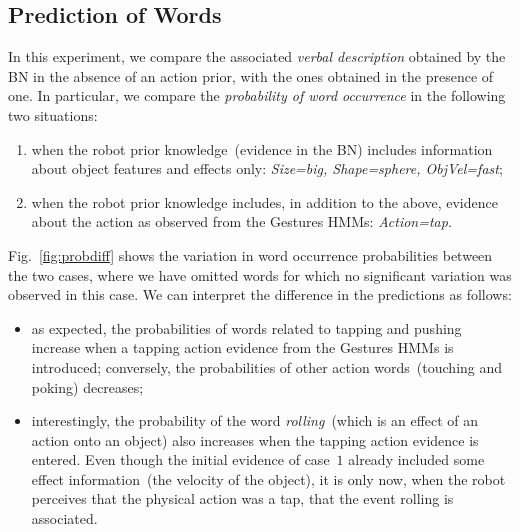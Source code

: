 \subsection{Prediction of Words}

In this experiment, we compare the associated \emph{verbal description} obtained by the \acl{BN} in the absence of an action prior, with the ones obtained in the presence of one. In particular, we compare the \emph{probability of word occurrence} in the following two situations:
\begin{enumerate}
\item when the robot prior knowledge~(evidence in the \ac{BN}) includes information about object features and effects only: \emph{Size=big, Shape=sphere, ObjVel=fast};

\item when the robot prior knowledge includes, in addition to the above, evidence about the action as observed from the Gestures \acp{HMM}: \emph{Action=tap}.
\end{enumerate}

Fig.~\ref{fig:probdiff} shows the variation in word occurrence probabilities between the two cases, where we have omitted words for which no significant variation was observed in this case. We can interpret the difference in the predictions as follows:
\begin{itemize}
\item as expected, the probabilities of words related to tapping and pushing increase when a tapping action evidence from the Gestures \acp{HMM} is introduced; conversely, the probabilities of other action words~(touching and poking) decreases;

\item interestingly, the probability of the word \emph{rolling}~(which is an effect of an action onto an object) also increases when the tapping action evidence is entered. Even though the initial evidence of case~$1$ already included some effect information~(the velocity of the object), it is only now, when the robot perceives that the physical action was a tap, that the event rolling is associated.
\end{itemize}
